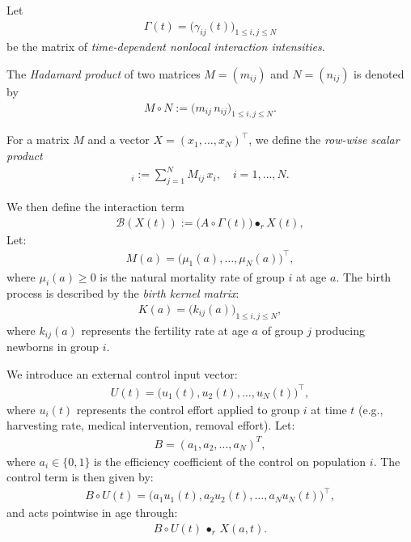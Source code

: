 \documentclass[10pt, a4paper]{amsart}
\theoremstyle{plain}
\theoremstyle{definition}
\theoremstyle{remark}
\numberwithin{equation}{section}
\begin{document}
Let 
\begin{align}
\Gamma(t) = \big( \gamma_{ij}(t) \big)_{1 \le i,j \le N}
\end{align}
be the matrix of \emph{time-dependent nonlocal interaction intensities}.

The \emph{Hadamard product} of two matrices \(M=(m_{ij})\) and \(N=(n_{ij})\) is denoted by
\begin{align}
 M \circ N := \big( m_{ij} \, n_{ij} \big)_{1 \le i,j \le N}.
\end{align}

For a matrix \(M\) and a vector \(X = (x_1,\dots,x_N)^\top\), we define the \emph{row-wise scalar product} 
\begin{align}
[M \bullet_r X]_i := \sum_{j=1}^N M_{ij} \, x_i, \quad i=1,\dots,N.
\end{align}

We then define the interaction term
\begin{align}\label{a3.7}
\mathcal{B}(X(t)) := \big( A \circ \Gamma(t) \big) \bullet_r X(t),
\end{align}
Let:
\begin{align}
    M(a) = \big(\mu_1(a), \dots, \mu_N(a)\big)^\top,
\end{align}
where $\mu_i(a) \geq 0$ is the natural mortality rate of group $i$ at age $a$. The birth process is described by the \emph{birth kernel matrix}:
\begin{align}
    K(a) = \big(k_{ij}(a)\big)_{1 \leq i,j \leq N},
\end{align}
where $k_{ij}(a)$ represents the fertility rate at age $a$ of group $j$ producing newborns in group $i$.

We introduce an external control input vector:
\begin{align}
    U(t) = \big( u_1(t), u_2(t), \dots, u_N(t) \big)^\top,
\end{align}
where $u_i(t)$ represents the control effort applied to group $i$ at time $t$ (e.g., harvesting rate, medical intervention, removal effort). Let:
\begin{align}\label{a3.12}
    B = (a_1, a_2, \dots, a_N)^T,
\end{align}
where $a_i \in \lbrace 0,1\rbrace$ is the efficiency coefficient of the control on population $i$. The control term is then given by:
\begin{align}
    B\circ U(t) = \big( a_1 u_1(t), a_2 u_2(t), \dots, a_N u_N(t) \big)^\top,
\end{align}
and acts pointwise in age through:
\begin{align}
    B\circ U(t) \, \bullet_r  \, X(a,t).
\end{align}
\end{document}
